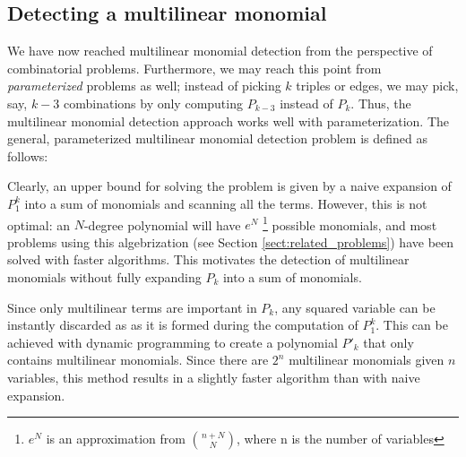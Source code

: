 \subsection{Detecting a multilinear monomial}
\label{sect:problem_definition}

We have now reached multilinear monomial detection from the perspective 
of combinatorial problems. Furthermore, we may reach this point from 
\emph{parameterized} problems as well; instead of picking $k$ triples or edges, 
we may pick, say, $k-3$ combinations by only computing $P_{k-3}$ instead of $P_k$. 
Thus, the multilinear monomial detection approach works well with parameterization. 
The general, parameterized multilinear monomial detection problem is defined as follows: 

\begin{problem}
\end{problem}

Clearly, an upper bound for solving the problem is given by a 
naive expansion of $P_1^k$ into a sum of monomials and scanning all the terms. 
However, this is not optimal: an $N$-degree polynomial will have $e^N$
\footnote{$e^N$ is an approximation from $\binom{n+N}{N}$, where n is the number of variables} 
possible monomials, and most problems using this algebrization 
(see Section \ref{sect:related_problems}) 
have been solved with faster algorithms. 
This motivates the detection of multilinear monomials 
without fully expanding $P_k$ into a sum of monomials.

Since only multilinear terms are important in $P_k$, 
any squared variable can be instantly discarded as
as it is formed 
during the computation of $P_1^k$. 
This can be achieved with dynamic programming 
to create a polynomial $P'_k$ that 
only contains multilinear monomials. 
Since there are $2^n$ multilinear monomials given $n$ variables, 
this method results in a slightly 
faster algorithm than with naive expansion.


